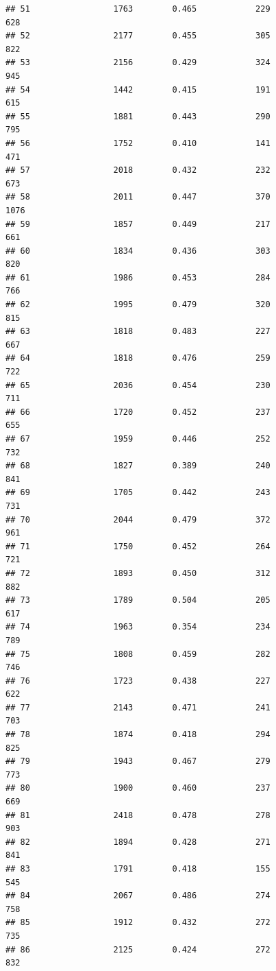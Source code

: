 \documentclass[]{book}
\begin{document}
\begin{verbatim}
## 51                 1763        0.465            229                628
## 52                 2177        0.455            305                822
## 53                 2156        0.429            324                945
## 54                 1442        0.415            191                615
## 55                 1881        0.443            290                795
## 56                 1752        0.410            141                471
## 57                 2018        0.432            232                673
## 58                 2011        0.447            370               1076
## 59                 1857        0.449            217                661
## 60                 1834        0.436            303                820
## 61                 1986        0.453            284                766
## 62                 1995        0.479            320                815
## 63                 1818        0.483            227                667
## 64                 1818        0.476            259                722
## 65                 2036        0.454            230                711
## 66                 1720        0.452            237                655
## 67                 1959        0.446            252                732
## 68                 1827        0.389            240                841
## 69                 1705        0.442            243                731
## 70                 2044        0.479            372                961
## 71                 1750        0.452            264                721
## 72                 1893        0.450            312                882
## 73                 1789        0.504            205                617
## 74                 1963        0.354            234                789
## 75                 1808        0.459            282                746
## 76                 1723        0.438            227                622
## 77                 2143        0.471            241                703
## 78                 1874        0.418            294                825
## 79                 1943        0.467            279                773
## 80                 1900        0.460            237                669
## 81                 2418        0.478            278                903
## 82                 1894        0.428            271                841
## 83                 1791        0.418            155                545
## 84                 2067        0.486            274                758
## 85                 1912        0.432            272                735
## 86                 2125        0.424            272                832

\end{verbatim}
\end{document}

